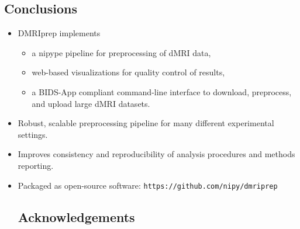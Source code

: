 \documentclass[a0, landscape]{a0poster}
\begin{document}
\begin{multicols}{3}
\color{SaddleBrown} %

\section*{Conclusions}

\begin{itemize}
    \item DMRIprep implements
    \begin{itemize}
        \item a nipype pipeline for preprocessing of dMRI data,
        \item web-based visualizations for quality control of results,
        \item a BIDS-App compliant command-line interface to download, preprocess, and upload large dMRI datasets.
    \end{itemize}

    \item Robust, scalable preprocessing pipeline for many different experimental settings.
    \item Improves consistency and reproducibility of analysis procedures and methods reporting.
    \item Packaged as open-source software: \texttt{https://github.com/nipy/dmriprep}

\color{DarkSlateGray} %


\nocite{*} %
\footnotesize  %

\subsection*{Acknowledgements} \footnotesize


\end{itemize}
\end{multicols}
\end{document}
